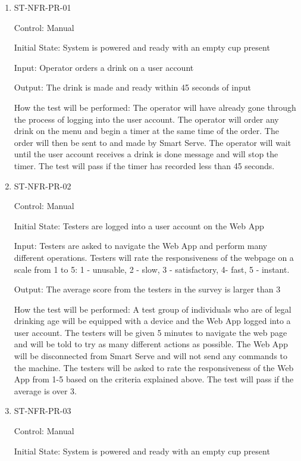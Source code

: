 \documentclass[12pt, titlepage]{article}
\begin{document}
\begin{enumerate}

\item{ST-NFR-PR-01\\}

Control: Manual

Initial State: System is powered and ready with an empty cup present

Input: Operator orders a drink on a user account

Output: The drink is made and ready within 45 seconds of input

How the test will be performed: The operator will have already gone through the process of logging into the user account. The operator will order any drink on the menu and begin a timer at the same time of the order. The order will then be sent to and made by Smart Serve. The operator will wait until the user account receives a drink is done message and will stop the timer. The test will pass if the timer has recorded less than 45 seconds.
					
\item{ST-NFR-PR-02\\}

Control: Manual

Initial State: Testers are logged into a user account on the Web App

Input: Testers are asked to navigate the Web App and perform many different operations. Testers will rate the responsiveness of the webpage on a scale from 1 to 5: 1 - unusable, 2 - slow, 3 - satisfactory, 4- fast, 5 - instant.

Output: The average score from the testers in the survey is larger than 3

How the test will be performed: A test group of individuals who are of legal drinking age will be equipped with a device and the Web App logged into a user account. The testers will be given 5 minutes to navigate the web page and will be told to try as many different actions as possible. The Web App will be disconnected from Smart Serve and will not send any commands to the machine. The testers will be asked to rate the responsiveness of the Web App from 1-5 based on the criteria explained above. The test will pass if the average is over 3.

\item{ST-NFR-PR-03\\}

Control: Manual

Initial State: System is powered and ready with an empty cup present


\end{enumerate}
\end{document}
